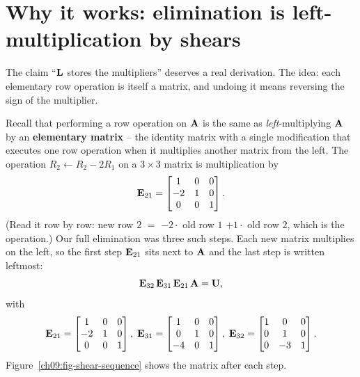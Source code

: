 \section{Why it works: elimination is left-multiplication by shears}
\label{ch09:why-it-works}

The claim ``$\mathbf{L}$ stores the multipliers'' deserves a real derivation. The idea: each
elementary row operation is itself a matrix, and undoing it means reversing the sign of the
multiplier.

Recall that performing a row operation on $\mathbf{A}$ is the same as \emph{left}-multiplying
$\mathbf{A}$ by an \textbf{elementary matrix} -- the identity matrix with a single modification
that executes one row operation when it multiplies another matrix from the left. The operation
$R_2 \leftarrow R_2 - 2R_1$ on a $3\times 3$ matrix is multiplication by
\[
  \mathbf{E}_{21} = \begin{bmatrix} 1 & 0 & 0 \\ -2 & 1 & 0 \\ 0 & 0 & 1 \end{bmatrix}.
\]
(Read it row by row: new row $2$ $=$ $-2\cdot$ old row $1$ $+1\cdot$ old row $2$, which is
the operation.) Our full elimination was three such steps. Each new matrix multiplies on the
left, so the first step $\mathbf{E}_{21}$ sits next to $\mathbf{A}$ and the last step is written
leftmost:
\[
  \mathbf{E}_{32}\,\mathbf{E}_{31}\,\mathbf{E}_{21}\,\mathbf{A} = \mathbf{U},
\]
with
\[
  \mathbf{E}_{21} = \begin{bmatrix} 1&0&0\\-2&1&0\\0&0&1 \end{bmatrix},\;
  \mathbf{E}_{31} = \begin{bmatrix} 1&0&0\\0&1&0\\-4&0&1 \end{bmatrix},\;
  \mathbf{E}_{32} = \begin{bmatrix} 1&0&0\\0&1&0\\0&-3&1 \end{bmatrix}.
\]
Figure~\ref{ch09:fig-shear-sequence} shows the matrix after each step.


